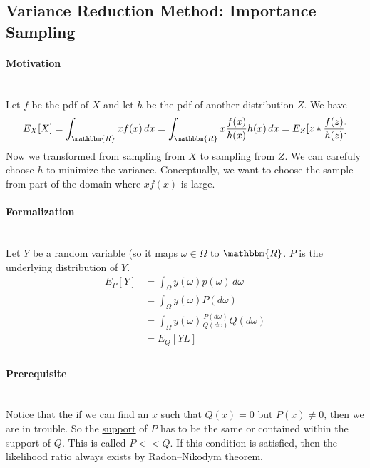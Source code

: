 \subsection{Variance Reduction Method: Importance Sampling}
\paragraph{Motivation} \mbox{}\\
Let $f$ be the pdf of $X$ and let $h$ be the pdf of another distribution $Z$. We have     \begin{align*}
    E_X[X] = \int_{\mathbbm{R}} x f(x) \, dx = \int_{\mathbbm{R}} x \frac{f(x)}{h(x)} h(x) \, dx = E_Z[z * \frac{f(z)}{h(z)}]
    \end{align*}
Now we transformed from sampling from $X$ to sampling from $Z$. We can carefuly choose $h$ to minimize the variance. Conceptually, we want to choose the sample from part of the domain where $x f(x)$ is large. 

\paragraph{Formalization} \mbox{}\\
Let $Y$ be a random variable (so it maps $\omega \in \Omega$ to $\mathbbm{R}$. $P$ is the underlying distribution of $Y$. 
    \begin{align*}
        E_P[Y] 
        & = \int_{\Omega} y(\omega) p(\omega) \, d\omega \\
        & = \int_{\Omega} y(\omega) P(d\omega) \tag{Notation change} \\
        & = \int_{\Omega} y(\omega) \frac{P(d\omega)}{Q(d\omega)}Q(d\omega) \\
        & = E_Q[YL] \tag{L is likelihood ratio} \\
    \end{align*}

\paragraph{Prerequisite} \mbox{}\\
Notice that the if we can find an $x$ such that $Q(x) = 0$ but $P(x) \neq 0$, then we are in trouble. So the \href{https://en.wikipedia.org/wiki/Support_(mathematics)}{support} of $P$ has to be the same or contained within the support of $Q$. This is called $P << Q$. If this condition is satisfied, then the likelihood ratio always exists by Radon–Nikodym theorem. 

